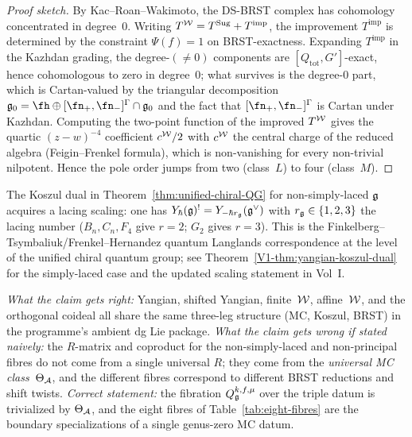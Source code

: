 \begin{proof}[Proof sketch]
By Kac--Roan--Wakimoto, the DS-BRST complex has cohomology
concentrated in degree~$0$. Writing $T^{\mathcal{W}} = T^{\mathrm{Sug}}
+ T^{\mathrm{imp}}$, the improvement $T^{\mathrm{imp}}$ is
determined by the constraint $\Psi(f)=1$ on BRST-exactness. Expanding
$T^{\mathrm{imp}}$ in the Kazhdan grading, the degree-$(\ne 0)$
components are $[Q_{\mathrm{tot}},G']$-exact, hence cohomologous to
zero in degree~$0$; what survives is the degree-$0$ part, which is
Cartan-valued by the triangular decomposition
$\fg_0 = \fh\oplus[\fn_+,\fn_-]^\Gamma\cap\fg_0$ and the fact that
$[\fn_+,\fn_-]^\Gamma$ is Cartan under Kazhdan. Computing the
two-point function of the improved $T^{\mathcal{W}}$ gives the quartic
$(z-w)^{-4}$ coefficient $c^{\mathcal{W}}/2$ with $c^{\mathcal{W}}$ the central charge
of the reduced algebra (Feigin--Frenkel formula), which is
non-vanishing for every non-trivial nilpotent. Hence the pole order
jumps from two (class~$L$) to four (class~$M$).
\end{proof}

\begin{remark}
\label{rem:qlanglands-non-simply-laced}
The Koszul dual in Theorem~\ref{thm:unified-chiral-QG}
for non-simply-laced $\mathfrak{g}$ acquires a lacing scaling: one has
$Y_\hbar(\mathfrak{g})^! = Y_{-\hbar r_{\mathfrak{g}}}(\mathfrak{g}^\vee)$ with
$r_{\mathfrak{g}}\in\{1,2,3\}$ the lacing number ($B_n,C_n,F_4$ give $r=2$;
$G_2$ gives $r=3$). This is the Finkelberg--Tsymbaliuk/Frenkel--Hernandez
quantum Langlands correspondence at the level of the unified
chiral quantum group; see Theorem~\ref{V1-thm:yangian-koszul-dual}
for the simply-laced case and the updated scaling statement in
Vol~I.
\end{remark}

\begin{remark}
\label{rem:first-principles-triple-unified}
\emph{What the claim gets right:} Yangian, shifted Yangian, finite~$\mathcal{W}$,
affine~$\mathcal{W}$, and the orthogonal coideal all share the same three-leg
structure (MC, Koszul, BRST) in the programme's ambient dg Lie package.
\emph{What the claim gets wrong if stated naively:} the $R$-matrix and
coproduct for the non-simply-laced and non-principal fibres do not
come from a single universal $R$; they come from the \emph{universal MC
class}~$\Theta_{\mathcal{A}}$, and the different fibres correspond to different
BRST reductions and shift twists. \emph{Correct statement:} the
fibration $Q_{\mathfrak{g}}^{k,f,\mu}$ over the triple datum is trivialized by
$\Theta_{\mathcal{A}}$, and the eight fibres of Table~\ref{tab:eight-fibres} are
the boundary specializations of a single genus-zero MC datum.
\end{remark}


